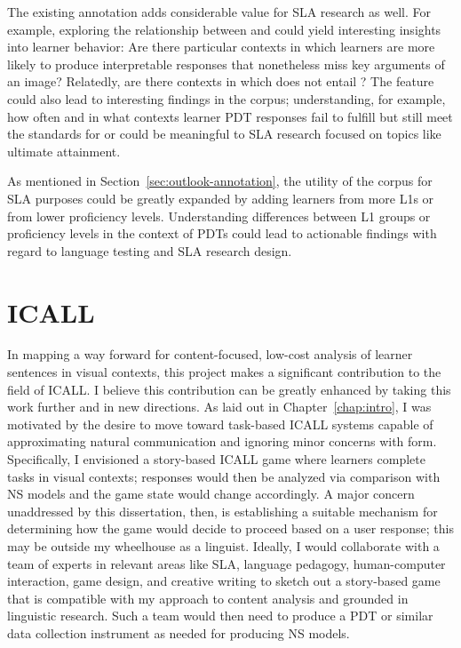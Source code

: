 The existing annotation adds considerable value for SLA research as well. For example, exploring the relationship between  and  could yield interesting insights into learner behavior: Are there particular contexts in which learners are more likely to produce interpretable responses that nonetheless miss key arguments of an image? Relatedly, are there contexts in which  does not entail ? The  feature could also lead to interesting findings in the corpus; understanding, for example, how often and in what contexts learner PDT responses fail to fulfill  but still meet the standards for  or  could be meaningful to SLA research focused on topics like ultimate attainment.

As mentioned in Section~\ref{sec:outlook-annotation}, the utility of the corpus for SLA purposes could be greatly expanded by adding learners from more L1s or from lower proficiency levels. Understanding differences between L1 groups or proficiency levels in the context of PDTs could lead to actionable findings with regard to language testing and SLA research design.

\section{ICALL}
\label{sec:outlook-icall}

In mapping a way forward for content-focused, low-cost analysis of learner sentences in visual contexts, this project makes a significant contribution to the field of ICALL. I believe this contribution can be greatly enhanced by taking this work further and in new directions. As laid out in Chapter~\ref{chap:intro}, I was motivated by the desire to move toward task-based ICALL systems capable of approximating natural communication and ignoring minor concerns with form. Specifically, I envisioned a story-based ICALL game where learners complete tasks in visual contexts; responses would then be analyzed via comparison with NS models and the game state would change accordingly. A major concern unaddressed by this dissertation, then, is establishing a suitable mechanism for determining how the game would decide to proceed based on a user response; this may be outside my wheelhouse as a linguist. Ideally, I would collaborate with a team of experts in relevant areas like SLA, language pedagogy, human-computer interaction, game design, and creative writing to sketch out a story-based game that is compatible with my approach to content analysis and grounded in linguistic research. Such a team would then need to produce a PDT or similar data collection instrument as needed for producing NS models.

